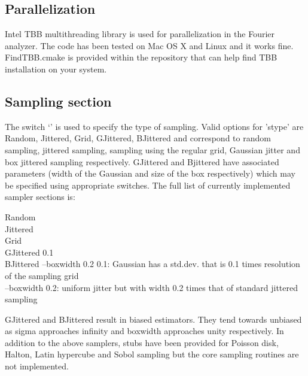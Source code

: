 \subsection{Parallelization}
Intel TBB multithreading library is used for parallelization in the Fourier analyzer. The code has been tested on Mac OS X and Linux and it works fine. FindTBB.cmake 
is provided within the repository that can help find TBB installation on your system.  
 
\subsection{Sampling section}
\label{subsec:ptanalyzer}
The switch `' is used to specify the type of sampling. Valid options for 'stype' are Random, Jittered, Grid, GJittered, BJittered and correspond to random sampling, jittered sampling, sampling using the regular grid, Gaussian jitter and box jittered sampling respectively. GJittered and Bjittered have associated parameters (width of the Gaussian and size of the box respectively) which may be specified using appropriate switches. The full list of currently implemented sampler sections is:
\begin{tcolorbox}
    Random \\
    Jittered \\
    Grid \\
    GJittered  0.1 \\
    BJittered --boxwidth 0.2 
\tcblower
    0.1: Gaussian has a std.dev. that is 0.1 times resolution of the sampling grid \\
   --boxwidth 0.2: uniform jitter but with width 0.2 times that of standard jittered sampling 
\end{tcolorbox}
GJittered and BJittered result in biased estimators. They tend towards unbiased as sigma approaches infinity and boxwidth approaches unity respectively. In addition to the above samplers, stubs have been provided for Poisson disk, Halton, Latin hypercube and Sobol sampling but the core sampling routines are not implemented. 

